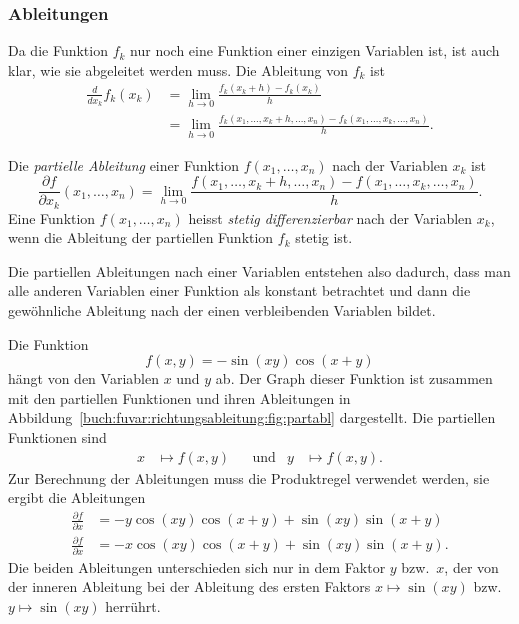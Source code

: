 %
%
\subsubsection{Ableitungen}
Da die Funktion $f_k$ nur noch eine Funktion einer einzigen Variablen
ist, ist auch klar, wie sie abgeleitet werden muss.
Die Ableitung von $f_k$ ist
\begin{align*}
\frac{d}{dx_k} f_k(x_k)
&=
\lim_{h\to 0} \frac{f_k(x_k+h)-f_k(x_k)}{h}
\\
&=
\lim_{h\to 0}
\frac{f_k(x_1,\dots,x_k+h,\dots,x_n)-f_k(x_1,\dots,x_k,\dots,x_n)}{h}.
\end{align*}

\begin{definition}
\label{buch:fuvar:richtungsbleitung:def:partielleableitung}
Die {\em partielle Ableitung} einer Funktion $f(x_1,\dots,x_n)$ nach der
%
%
Variablen $x_k$ ist
\[
\frac{\partial f}{\partial x_k}(x_1,\dots,x_n)
=
\lim_{h\to 0}
\frac{f(x_1,\dots,x_k+h,\dots,x_n)-f(x_1,\dots,x_k,\dots,x_n)}{h}.
\]
Eine Funktion $f(x_1,\dots,x_n)$ heisst {\em stetig differenzierbar}
nach der Variablen $x_k$, wenn die Ableitung der partiellen Funktion 
$f_k$ stetig ist.
\end{definition}

Die partiellen Ableitungen nach einer Variablen entstehen also dadurch,
dass man alle anderen Variablen einer Funktion als konstant betrachtet
und dann die gewöhnliche Ableitung nach der einen verbleibenden Variablen
bildet.

\begin{beispiel}
\label{buch:fuvar:richtungsableitung:beispiel:sincos}
Die Funktion
\[
f(x,y)
=
-\sin(xy)\cos(x+y)
\]
hängt von den Variablen $x$ und $y$ ab.
Der Graph dieser Funktion ist zusammen mit den partiellen
Funktionen und ihren Ableitungen in
Abbildung~\ref{buch:fuvar:richtungsableitung:fig:partabl}
dargestellt.
Die partiellen Funktionen sind
\begin{align*}
x&\mapsto f(x,y)
&&\text{und}&
y&\mapsto f(x,y).
\end{align*}
Zur Berechnung der Ableitungen muss die Produktregel verwendet
werden, sie ergibt die Ableitungen
\begin{align*}
\frac{\partial f}{\partial x}
&=
-y\cos(xy)\cos(x+y) +\sin(xy)\sin(x+y)
\\
\frac{\partial f}{\partial x}
&=
-x\cos(xy)\cos(x+y) +\sin(xy)\sin(x+y).
\end{align*}
Die beiden Ableitungen unterschieden sich nur in dem Faktor $y$ bzw.~$x$,
der von der inneren Ableitung bei der Ableitung des ersten Faktors
$x\mapsto\sin(xy)$ bzw.~$y\mapsto\sin(xy)$ herrührt.
\end{beispiel}

